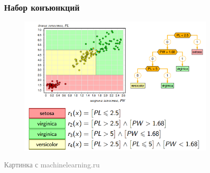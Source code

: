\documentclass[12pt]{beamer}
\begin{document}
\begin{frame}\frametitle{Набор конъюнкций}
\begin{figure}[htbp]
  \includegraphics[height=190pt, keepaspectratio = true]{images/fisher1}   
\end{figure}
\footnotesize\textcolor{gray} {Картинка с machinelearning.ru}

\end{frame}

\end{document}
